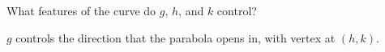 What features of the curve do $g$, $h$, and $k$ control?

\begin{solution}
    $g$ controls the direction that the parabola opens in, with vertex at $\left(h, k\right)$.
\end{solution}